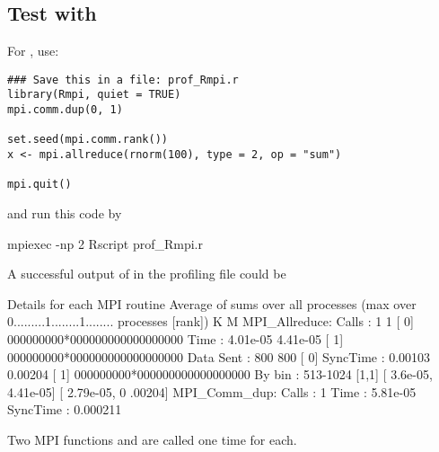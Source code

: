 \subsection{Test with }

For , use:
\begin{lstlisting}[language=rr,title=Test script for pbdMPI]
### Save this in a file: prof_Rmpi.r
library(Rmpi, quiet = TRUE)
mpi.comm.dup(0, 1)

set.seed(mpi.comm.rank())
x <- mpi.allreduce(rnorm(100), type = 2, op = "sum")

mpi.quit()
\end{lstlisting}
and run this code by
\begin{Code}
mpiexec -np 2 Rscript prof_Rmpi.r
\end{Code}

A successful output of 
in the profiling file  could be
\begin{Output}
Details for each MPI routine
                  Average of sums over all processes
                                (max over          0.........1........1........
                                 processes [rank])           K        M
MPI_Allreduce:
        Calls     :          1            1 [   0] 000000000*000000000000000000
        Time      :   4.01e-05     4.41e-05 [   1] 000000000*000000000000000000
        Data Sent :        800          800 [   0]
        SyncTime  :    0.00103      0.00204 [   1] 000000000*000000000000000000
        By bin    : 513-1024    [1,1]   [   3.6e-05,  4.41e-05] [  2.79e-05,   0
.00204]
MPI_Comm_dup:     
        Calls     :          1
        Time      :   5.81e-05
        SyncTime  :   0.000211
\end{Output}
Two MPI  functions  and 
are called one time for each.

